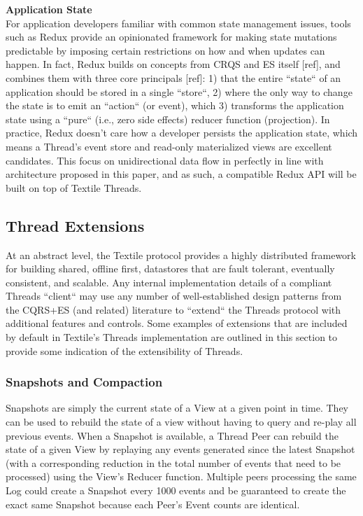 \documentclass{comjnl}
\begin{document}
\textbf{Application State} \\

For application developers familiar with common state management issues, tools such as Redux provide an opinionated framework for making state mutations predictable by imposing certain restrictions on how and when updates can happen. In fact, Redux builds on concepts from CRQS and ES itself [ref], and combines them with three core principals [ref]: 1) that the entire “state“ of an application should be stored in a single “store“, 2) where the only way to change the state is to emit an “action“ (or event), which 3) transforms the application state using a “pure“ (i.e., zero side effects) reducer function (projection). In practice, Redux doesn't care how a developer persists the application state, which means a Thread’s event store and read-only materialized views are excellent candidates. This focus on unidirectional data flow in perfectly in line with architecture proposed in this paper, and as such, a compatible Redux API will be built on top of Textile Threads.


\subsection{Thread Extensions}

At an abstract level, the Textile protocol provides a highly distributed framework for building shared, offline first, datastores that are fault tolerant, eventually consistent, and scalable. Any internal implementation details of a compliant Threads “client“ may use any number of well-established design patterns from the CQRS+ES (and related) literature to “extend“ the Threads protocol with additional features and controls. Some examples of extensions that are included by default in Textile’s Threads implementation are outlined in this section to provide some indication of the extensibility of Threads.

\subsubsection{Snapshots and Compaction}

Snapshots are simply the current state of a View at a given point in time. They can be used to rebuild the state of a view without having to query and re-play all previous events. When a Snapshot is available, a Thread Peer can rebuild the state of a given View by replaying any events generated since the latest Snapshot (with a corresponding reduction in the total number of events that need to be processed) using the View’s Reducer function. Multiple peers processing the same Log could create a Snapshot every 1000 events and be guaranteed to create the exact same Snapshot because each Peer’s Event counts are identical. 
\end{document}

